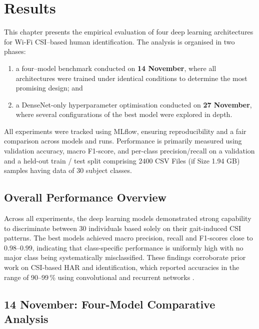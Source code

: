 \section{Results}
\label{sec:results}

This chapter presents the empirical evaluation of four deep learning
architectures for Wi-Fi CSI–based human identification. The analysis is
organised in two phases:

\begin{enumerate}
    \item a four–model benchmark conducted on \textbf{14 November}, where all
    architectures were trained under identical conditions to determine the
    most promising design; and
    \item a DenseNet-only hyperparameter optimisation conducted on
    \textbf{27 November}, where several configurations of the best model were
    explored in depth.
\end{enumerate}

All experiments were tracked using MLflow, ensuring reproducibility and
a fair comparison across models and runs. Performance is primarily measured
using validation accuracy, macro F1-score, and per-class precision/recall
on a validation and a held-out train / test split comprising 2400 CSV Files (if Size 1.94 GB) samples having data of
30 subject classes.

\subsection{Overall Performance Overview}

Across all experiments, the deep learning models demonstrated strong
capability to discriminate between 30 individuals based solely on their
gait-induced CSI patterns. The best models achieved macro precision,
recall and F1-scores close to $0.98$--$0.99$, indicating that
class-specific performance is uniformly high with no major class being
systematically misclassified. These findings corroborate prior work
on CSI-based HAR and identification, which reported accuracies in the
range of 90--99\,\% using convolutional and recurrent networks
\parencite{zhuravchak2022csihar, csibench2025}.

\subsection{14 November: Four-Model Comparative Analysis}
\label{subsec:four_model_comparison}

